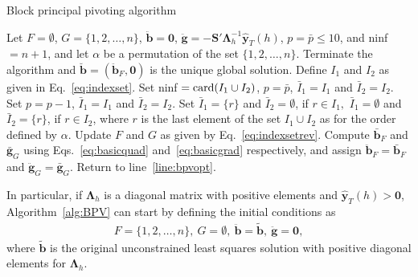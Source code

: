 \documentclass[11pt]{article}
\newcommand{\0}{\phantom{0}}
\begin{document}
\begin{algorithm}
	\caption{Block principal pivoting algorithm}
	\label{alg:BPV}
	\begin{spacing}{1.3}
		\begin{algorithmic}[1]
			\Require Let $F = \emptyset$, $G = \{1, 2, \dots, n\}$, $\ddot{\bm{b}} = \bm{0}$, $\ddot{\bm{g}} = -\bm{S}'\bm{\Lambda}_{h}^{-1}\hat{\bm{y}}_{T}(h)$, $p = \bar{p} \leq 10$, and ninf $= n + 1$, and let $\alpha$ be a permutation of the set $\{1, 2, \dots, n\}$.
			 \label{line:bpvopt}
			\State Terminate the algorithm and $\breve{\bm{b}} = (\ddot{\bm{b}}_{F}, \bm{0})$ is the unique global solution.
			\Else{}
			\State Define $I_{1}$ and $I_{2}$ as given in Eq.~\eqref{eq:indexset}.
			\State Set ninf $= \textnormal{card}(I_{1} \cup I_{2})$, $p = \bar{p}$, $\bar{I}_{1} = I_{1}$ and $\bar{I}_{2} = I_{2}$.
			\State Set $p = p - 1$, $\bar{I}_{1} = I_{1}$ and $\bar{I}_{2} = I_{2}$.
			\State Set $\bar{I}_{1} = \{r\}$ and $\bar{I}_{2} = \emptyset$, if $r \in I_{1},$
			\State \hspace{5.3mm} $\bar{I}_{1} = \emptyset $ and $\bar{I}_{2} = \{r\}$, if $r \in I_{2}$,
			\State where $r$ is the last element of the set $I_{1} \cup I_{2}$ as for the order defined by $\alpha$.
			\EndIf
			\State Update $F$ and $G$ as given by Eq.~\eqref{eq:indexsetrev}.
			\State Compute $\bar{\bm{b}}_{F}$ and $\bar{\bm{g}}_{G}$ using Eqs.~\eqref{eq:basicquad} and~\eqref{eq:basicgrad} respectively, and assign $\ddot{\bm{b}}_{F} = \bar{\bm{b}}_{F}$ and $\ddot{\bm{g}}_{G} = \bar{\bm{g}}_{G}$.
			\State Return to line~\ref{line:bpvopt}.
			\EndIf
		\end{algorithmic}
	\end{spacing}
\end{algorithm}


In particular, if $\bm{\Lambda}_{h}$ is a diagonal matrix with positive elements and $\hat{\bm{y}}_{T}(h) > \bm{0}$, Algorithm~\ref{alg:BPV} can start by defining the initial conditions as
\begin{align*}
F = \{1, 2, \dots, n\},\ G = \emptyset,\ \ddot{\bm{b}} = \tilde{\bm{b}},\ \ddot{\bm{g}} = \bm{0},
\end{align*}
where $\tilde{\bm{b}}$ is the original unconstrained least squares solution with positive diagonal elements for $\bm{\Lambda}_{h}$.
\end{document}
